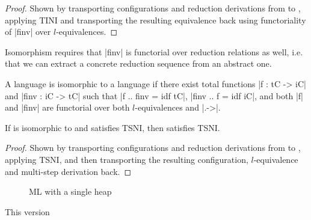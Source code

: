 \begin{proof}
    Shown by transporting configurations and reduction derivations
    from  to , applying TINI and transporting the resulting
    equivalence back using functoriality of |finv| over $l$-equivalences.
\end{proof}

Isomorphism requires that |finv| is functorial over reduction relations
as well, i.e. that we can extract a concrete reduction sequence from an abstract one.

\begin{definition}
    A language  is
    isomorphic to a language  if there exist total functions
    |f : tC -> iC| and |finv : iC -> tC| such that |f .. finv = idf tC|, |finv .. f = idf iC|, and both |f| and |finv| are
    functorial over both $l$-equivalences and |.->|.
\end{definition}

\begin{theorem}
    If  is isomorphic to  and  satisfies TSNI, then
     satisfies TSNI.
\end{theorem}

\begin{proof}
    Shown by transporting configurations and reduction derivations from
     to , applying TSNI, and then transporting the
    resulting configuration, $l$-equivalence and multi-step derivation back.
\end{proof}



\begin{figure}


\caption{ML with a single heap}
\label{fig:comb}
\end{figure}

This version
